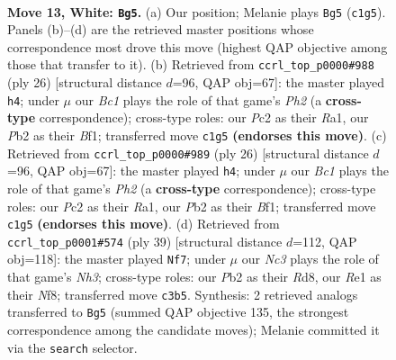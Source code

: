 \documentclass[11pt]{article}
\begin{document}
\clearpage

\begin{figure}[p]\centering
\begin{subfigure}{0.46\textwidth}\centering
\resizebox{\linewidth}{!}{%
\newchessgame
\chessboard[
  setfen={rnbr2k1/5pb1/2p2np1/pp2N2p/4P3/P1N5/1PP1BPPP/R1B1RK2 w - - 0 13},
  showmover=false,
  pgfstyle=straightmove, color=movearrow, markmove={c1-g5}
]}
\caption{}
\end{subfigure}\hfill
\begin{subfigure}{0.46\textwidth}\centering
\resizebox{\linewidth}{!}{%
\newchessgame
\chessboard[
  setfen={r3k2r/pbp1p1bp/np2n1p1/1N2Pp2/2P2P2/4BN2/PP2K1PP/R4B1R w kq - 8 14},
  showmover=false,
  pgfstyle=straightmove, color=movearrow, markmove={h2-h4}
]}
\caption{}
\end{subfigure}
\\[4pt]
\begin{subfigure}{0.46\textwidth}\centering
\resizebox{\linewidth}{!}{%
\newchessgame
\chessboard[
  setfen={r3k2r/pbp1p1bp/np2n1p1/1N2Pp2/2P2P2/4BN2/PP2K1PP/R4B1R w kq - 8 14},
  showmover=false,
  pgfstyle=straightmove, color=movearrow, markmove={h2-h4}
]}
\caption{}
\end{subfigure}\hfill
\begin{subfigure}{0.46\textwidth}\centering
\resizebox{\linewidth}{!}{%
\newchessgame
\chessboard[
  setfen={3r1n2/ppkbr1pp/2p2p1n/P6N/3NP1P1/3R3P/BPP5/2K4R b - - 2 20},
  showmover=false,
  pgfstyle=straightmove, color=movearrow, markmove={h6-f7}
]}
\caption{}
\end{subfigure}
\caption{\textbf{Move 13, White: \texttt{Bg5}.} (a) Our position; Melanie plays \texttt{Bg5} (\texttt{c1g5}). Panels (b)--(d) are the retrieved master positions whose correspondence most drove this move (highest QAP objective among those that transfer to it). (b) Retrieved from \texttt{ccrl\_top\_p0000\#988} (ply 26) [structural distance $d$=96, QAP obj=67]: the master played \texttt{h4}; under $\mu$ our \emph{Bc1} plays the role of that game's \emph{Ph2} (a \textbf{cross-type} correspondence); cross-type roles: our \emph{P}c2 as their \emph{R}a1, our \emph{P}b2 as their \emph{B}f1; transferred move \texttt{c1g5} \textbf{(endorses this move)}. (c) Retrieved from \texttt{ccrl\_top\_p0000\#989} (ply 26) [structural distance $d$=96, QAP obj=67]: the master played \texttt{h4}; under $\mu$ our \emph{Bc1} plays the role of that game's \emph{Ph2} (a \textbf{cross-type} correspondence); cross-type roles: our \emph{P}c2 as their \emph{R}a1, our \emph{P}b2 as their \emph{B}f1; transferred move \texttt{c1g5} \textbf{(endorses this move)}. (d) Retrieved from \texttt{ccrl\_top\_p0001\#574} (ply 39) [structural distance $d$=112, QAP obj=118]: the master played \texttt{Nf7}; under $\mu$ our \emph{Nc3} plays the role of that game's \emph{Nh3}; cross-type roles: our \emph{P}b2 as their \emph{R}d8, our \emph{R}e1 as their \emph{N}f8; transferred move \texttt{c3b5}. Synthesis: 2 retrieved analogs transferred to \texttt{Bg5} (summed QAP objective 135, the strongest correspondence among the candidate moves); Melanie committed it via the \texttt{search} selector.}
\label{fig:thought-m24}
\end{figure}
\end{document}
